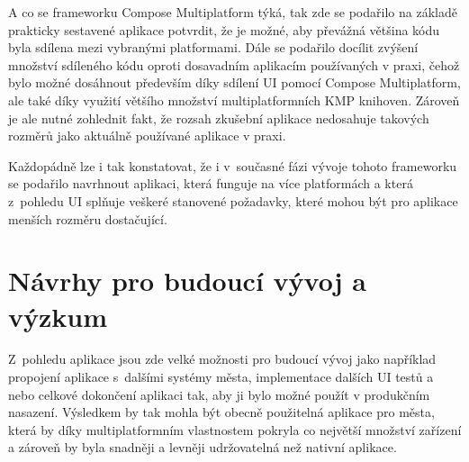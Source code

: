 \medskip

A co se frameworku Compose Multiplatform týká, tak zde se podařilo na základě prakticky sestavené aplikace potvrdit, že je možné, 
aby převážná většina kódu byla sdílena mezi vybranými platformami. Dále se podařilo docílit zvýšení množství sdíleného kódu oproti 
dosavadním aplikacím používaných v praxi, čehož bylo možné dosáhnout především díky sdílení UI pomocí Compose Multiplatform,
ale také díky využití většího množství multiplatformních KMP knihoven. 
Zároveň je ale nutné zohlednit fakt, že rozsah zkušební aplikace nedosahuje 
takových rozměrů jako aktuálně používané aplikace v praxi. 

Každopádně lze i tak konstatovat, že i v~současné fázi vývoje tohoto frameworku se podařilo navrhnout
aplikaci, která funguje na více platformách a která z~pohledu UI splňuje veškeré stanovené požadavky, které mohou být pro aplikace 
menších rozměru dostačující. 

\bigskip

\section{Návrhy pro budoucí vývoj a výzkum}
Z~pohledu aplikace jsou zde velké možnosti pro budoucí vývoj jako například propojení aplikace s~dalšími systémy města,
implementace dalších UI testů a nebo celkové dokončení aplikaci tak, aby ji bylo možné použít v produkčním nasazení. Výsledkem by tak mohla 
být obecně použitelná aplikace pro města, která by díky multiplatformním vlastnostem pokryla co největší množství zařízení a zároveň by 
byla snadněji a levněji udržovatelná než nativní aplikace.






